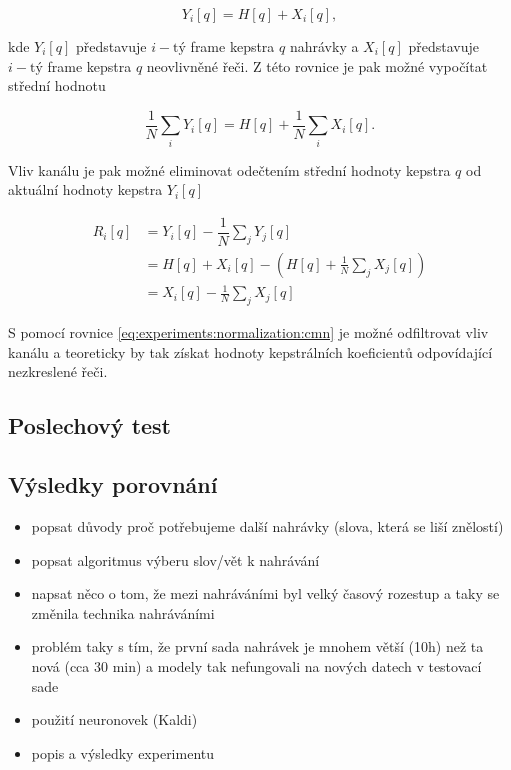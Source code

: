 \begin{equation}
  Y_i\left[q\right] = H\left[q\right] + X_i\left[q\right],
\end{equation}

\noindent kde $Y_i\left[q\right]$ představuje $i-\text{tý}$ frame kepstra $q$ nahrávky a $X_i\left[q\right]$ představuje $i-\text{tý}$ frame kepstra $q$ neovlivněné řeči. Z této rovnice je pak možné vypočítat střední hodnotu

\begin{equation}
  \frac{1}{N} \sum_i Y_i\left[q\right] = H\left[q\right] + \frac{1}{N} \sum_i X_i\left[q\right].
\end{equation}

\noindent Vliv kanálu je pak možné eliminovat odečtením střední hodnoty kepstra $q$ od aktuální hodnoty kepstra $Y_i\left[q\right]$

\begin{align}
  R_i\left[q\right] &= Y_i\left[q\right] - \dfrac{1}{N}\sum_{j} Y_j\left[q\right] \nonumber  \\
  &= H\left[q\right] + X_i\left[q\right] - \left( H\left[q\right] + \frac{1}{N} \sum_j X_j\left[q\right] \right) \nonumber  \\
  &= X_i\left[q\right] - \frac{1}{N} \sum_j X_j\left[q\right]
  \label{eq:experiments:normalization:cmn}
\end{align}

\noindent S pomocí rovnice \ref{eq:experiments:normalization:cmn} je možné odfiltrovat vliv kanálu a teoreticky by tak získat hodnoty kepstrálních koeficientů odpovídající nezkreslené řeči.

\subsection{Poslechový test}

\subsection{Výsledky porovnání}

\begin{itemize}
  \item popsat důvody proč potřebujeme další nahrávky (slova, která se liší znělostí)
  \item popsat algoritmus výberu slov/vět k nahrávání
  \item napsat něco o tom, že mezi nahráváními byl velký časový rozestup a taky se změnila technika nahráváními
  \item problém taky s tím, že první sada nahrávek je mnohem větší (10h) než ta nová (cca 30 min) a modely tak nefungovali na nových datech v testovací sade
  \item použití neuronovek (Kaldi)
  \item popis a výsledky experimentu 
\end{itemize}
